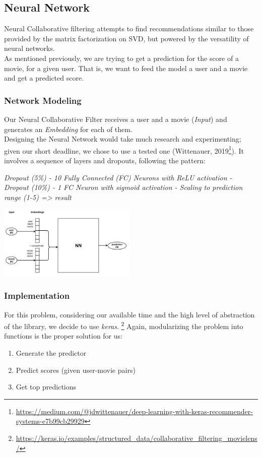 \subsection{Neural Network}
Neural Collaborative filtering attempts to find recommendations similar to those provided by the matrix
factorization on SVD, but powered by the versatility of neural networks.\\
As mentioned previously, we are trying to get a prediction for the score of a movie, for a given user.
That is, we want to feed the model a user and a movie and get a predicted score.\\
\subsubsection*{Network Modeling}
Our Neural Collaborative Filter receives a user and a movie (\emph{Input}) and generates an \emph{Embedding} for each of them.\\
Designing the Neural Network would take much research and experimenting; given our short deadline, we chose to use a tested one
(Wittenauer, 2019\footnote{\href{https://medium.com/@jdwittenauer/deep-learning-with-keras-recommender-systems-e7b99cb29929}{https://medium.com/@jdwittenauer/deep-learning-with-keras-recommender-systems-e7b99cb29929}}).
It involves a sequence of layers and dropouts, following the pattern:
\begin{center}
    \emph{Dropout (5\%) - 10 Fully Connected (FC) Neurons with ReLU activation - Dropout (10\%) - 1 FC Neuron with sigmoid activation - Scaling to prediction range (1-5) => result}\\
\end{center}
\begin{center}
    \captionsetup{type=figure}
    \includegraphics[width=250px]{images/nn-model.png}
\end{center}

\subsubsection*{Implementation}
For this problem, considering our available time and the high level of abstraction of the library, we decide to use \emph{keras}.
\footnote{\href{https://keras.io/examples/structured\_data/collaborative\_filtering\_movielens/}{https://keras.io/examples/structured\_data/collaborative\_filtering\_movielens/}}
Again, modularizing the problem into functions is the proper solution for us:
\begin{enumerate}
    \item Generate the predictor
    \item Predict scores (given user-movie pairs)
    \item Get top predictions
\end{enumerate}
